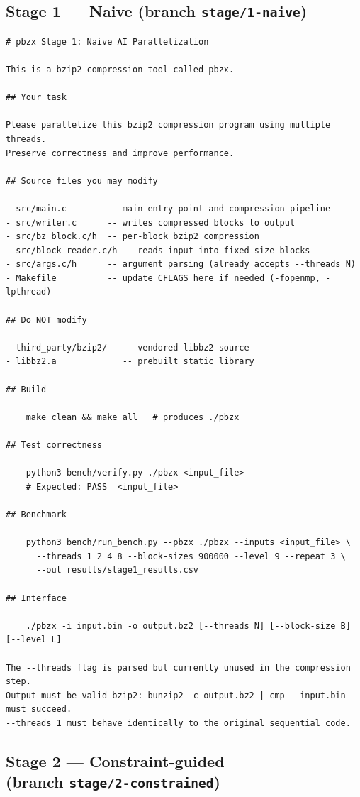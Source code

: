 \documentclass[conference]{IEEEtran}
\begin{document}
\subsection*{Stage 1 --- Naive (branch \texttt{stage/1-naive})}

\begin{lstlisting}
# pbzx Stage 1: Naive AI Parallelization

This is a bzip2 compression tool called pbzx.

## Your task

Please parallelize this bzip2 compression program using multiple threads.
Preserve correctness and improve performance.

## Source files you may modify

- src/main.c        -- main entry point and compression pipeline
- src/writer.c      -- writes compressed blocks to output
- src/bz_block.c/h  -- per-block bzip2 compression
- src/block_reader.c/h -- reads input into fixed-size blocks
- src/args.c/h      -- argument parsing (already accepts --threads N)
- Makefile          -- update CFLAGS here if needed (-fopenmp, -lpthread)

## Do NOT modify

- third_party/bzip2/   -- vendored libbz2 source
- libbz2.a             -- prebuilt static library

## Build

    make clean && make all   # produces ./pbzx

## Test correctness

    python3 bench/verify.py ./pbzx <input_file>
    # Expected: PASS  <input_file>

## Benchmark

    python3 bench/run_bench.py --pbzx ./pbzx --inputs <input_file> \
      --threads 1 2 4 8 --block-sizes 900000 --level 9 --repeat 3 \
      --out results/stage1_results.csv

## Interface

    ./pbzx -i input.bin -o output.bz2 [--threads N] [--block-size B] [--level L]

The --threads flag is parsed but currently unused in the compression step.
Output must be valid bzip2: bunzip2 -c output.bz2 | cmp - input.bin must succeed.
--threads 1 must behave identically to the original sequential code.
\end{lstlisting}

\subsection*{Stage 2 --- Constraint-guided\\(branch \texttt{stage/2-constrained})}
\end{document}
